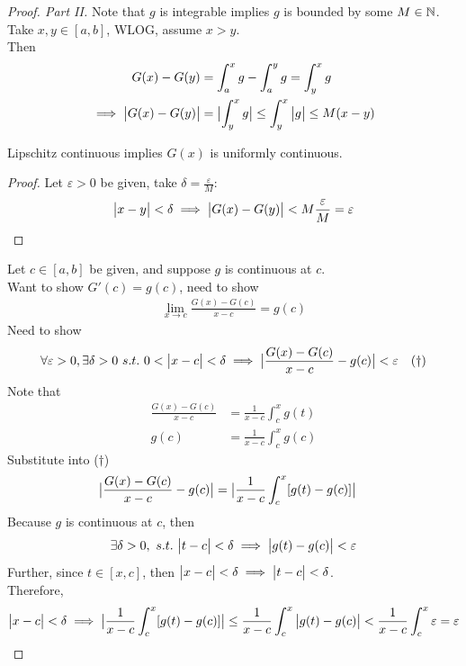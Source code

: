 \documentclass[11pt]{article}
\begin{document}
	\begin{proof}[Proof. Part II]
		Note that $g$ is integrable implies $g$ is bounded by some $M \in \mathbb{N}$. \\
		Take $x, y \in [a, b]$, WLOG, assume $x > y$. \\
		Then
		\begin{align}
			G(x) - G(y) &= \int_a^x g - \int_a^y g  = \int_y^x g \\
			\implies \big \vert {G(x) - G(y)} \big \vert &= \big \vert {\int_y^x g} \big \vert \leq \int_y^x \big \vert {g} \big \vert \leq M (x - y)
		\end{align}
	
		\begin{lemma}
			Lipschitz continuous implies $G(x)$ is uniformly continuous.
		\end{lemma}
		\begin{proof}	
			Let $\varepsilon > 0$ be given, take $\delta = \frac{\varepsilon}{M}$:
				\begin{align}
					\big \vert {x - y} \big \vert < \delta \implies \big \vert {G(x) - G(y)} \big \vert < M \frac{\varepsilon}{M} = \varepsilon
				\end{align}
		\end{proof}
		Let $c \in [a, b]$ be given, and suppose $g$ is continuous at $c$. \\
		Want to show $G'(c) = g(c)$, need to show
		\begin{align}
			\lim_{x \to c} \frac{G(x) - G(c)}{x - c} = g(c)
		\end{align}
		Need to show
		\begin{align}
			\forall \varepsilon > 0, \exists \delta > 0\ s.t.\ 0 < \big \vert {x - c} \big \vert < \delta \implies \big \vert {\frac{G(x) - G(c)}{x - c} - g(c)} \big \vert < \varepsilon \quad (\dagger)
		\end{align}
		Note that 
		\begin{align}
			\frac{G(x) - G(c)}{x - c} &= \frac{1}{x - c}\int_c^x g(t) \\
			g(c) &= \frac{1}{x-c} \int_c^x g(c)
		\end{align}
		Substitute into ($\dagger$)
		\begin{align}
			\big \vert {\frac{G(x) - G(c)}{x - c} - g(c)} \big \vert &= \big \vert {
			\frac{1}{x-c} \int_c^x [g(t) - g(c)]} \big \vert
		\end{align}
		Because $g$ is continuous at $c$, then
		\begin{align}
			\exists \delta > 0,\ s.t.\ \big \vert {t - c} \big \vert < \delta \implies \big \vert {g(t) - g(c)} \big \vert < \varepsilon
		\end{align}
		Further, since $t \in [x, c]$, then $\big \vert {x - c} \big \vert < \delta \implies \big \vert {t - c} \big \vert < \delta$. \\
		Therefore,
		\begin{align}
			\big \vert {x - c} \big \vert < \delta \implies \big \vert {\frac{1}{x - c} \int_c^x [g(t) - g(c)]} \big \vert
			\leq \frac{1}{x-c} \int_c^x \big \vert {g(t) - g(c)} \big \vert < \frac{1}{x-c} \int_c^x \varepsilon = \varepsilon
		\end{align}
	\end{proof}
	
\end{document}
